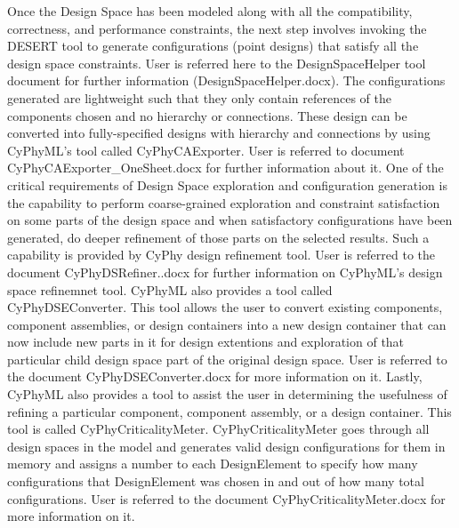 Once the Design Space has been modeled along with all the compatibility, correctness, and performance constraints, the next step involves invoking the DESERT tool to generate configurations (point designs) that satisfy all the design space constraints. User is referred here to the DesignSpaceHelper tool document for further information (DesignSpaceHelper.docx). The configurations generated are lightweight such that they only contain references of the components chosen and no hierarchy or connections. These design can be converted into fully-specified designs with hierarchy and connections by using CyPhyML's tool called CyPhyCAExporter. User is referred to document CyPhyCAExporter\_OneSheet.docx for further information about it. One of the critical requirements of Design Space exploration and configuration generation is the capability to perform coarse-grained exploration and constraint satisfaction on some parts of the design space and when satisfactory configurations have been generated, do deeper refinement of those parts on the selected results. Such a capability is provided by CyPhy design refinement tool. User is referred to the document CyPhyDSRefiner..docx for further information on CyPhyML's design space refinemnet tool. CyPhyML also provides a tool called CyPhyDSEConverter. This tool allows the user to convert existing components, component assemblies, or design containers into a new design container that can now include new parts in it for design extentions and exploration of that particular child design space part of the original design space. User is referred to the document CyPhyDSEConverter.docx for more information on it. Lastly, CyPhyML also provides a tool to assist the user in determining the usefulness of refining a particular component, component assembly, or a design container. This tool is called CyPhyCriticalityMeter. CyPhyCriticalityMeter goes through all design spaces in the model and generates valid design configurations for them in memory and assigns a number to each DesignElement to specify how many configurations that DesignElement was chosen in and out of how many total configurations. User is referred to the document CyPhyCriticalityMeter.docx for more information on it.